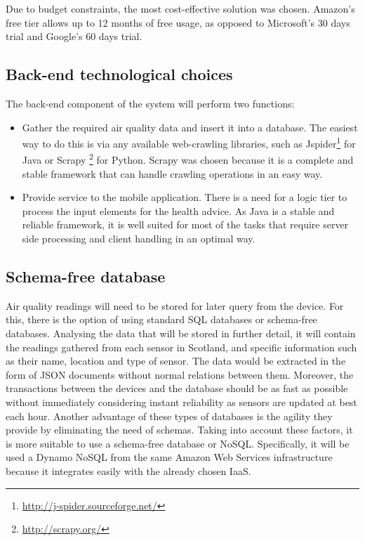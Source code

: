 Due to budget constraints, the most cost-effective solution was chosen. Amazon's free tier allows up to 12 months of free usage, as opposed to Microsoft's 30 days trial and Google's 60 days trial.

\subsection{Back-end technological choices}
The back-end component of the system will perform two functions: 

\begin{itemize}
	\item Gather the required air quality data and insert it into a database. The easiest way to do this is via any available web-crawling libraries, such as Jspider\footnote{\url{http://j-spider.sourceforge.net/}} for Java or Scrapy \footnote{\url{http://scrapy.org/}} for Python. Scrapy was chosen because it is a complete and stable framework that can handle crawling operations in an easy way. 
	\item Provide service to the mobile application. There is a need for a logic tier to process the input elements for the health advice. As Java is a stable and reliable framework,  it is well suited for most of the tasks that require server side processing and client handling in an optimal way.
\end{itemize}

\subsection{Schema-free database}

Air quality readings will need to be stored for later query from the device. For this, there is the option of using standard SQL databases or schema-free databases. Analysing the data that will be stored in further detail, it will contain the readings gathered from each sensor in Scotland, and specific information such as their name, location and type of sensor. The data would be extracted in the form of JSON documents without normal relations between them. Moreover, the transactions between the devices and the database should be as fast as possible without immediately considering instant reliability as sensors are updated at best each hour. Another advantage of these types of databases is the agility they provide by eliminating the need of schemas. Taking into account these factors, it is more suitable to use a schema-free database or NoSQL. Specifically, it will be used a Dynamo NoSQL from the same Amazon Web Services infrastructure because it integrates easily with the already chosen IaaS.

